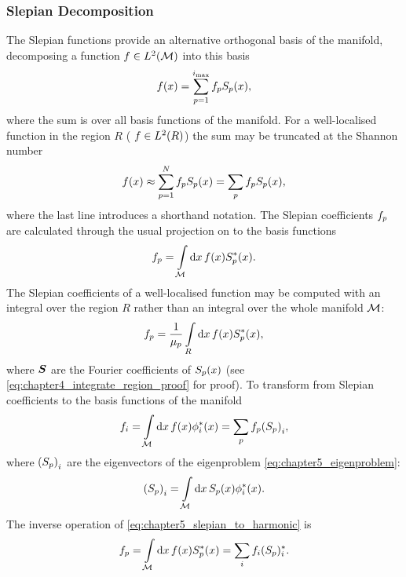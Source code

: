 \subsubsection{Slepian Decomposition}

The Slepian functions provide an alternative orthogonal basis of the manifold, decomposing a function \(f \in L^{2}(\mathcal{M})\) into this basis
%
\begin{equation}
	f(x)
	= \sum\limits_{p=1}^{i_{\text{max}}} {f}_{p} {S}_{p}(x),
\end{equation}
%
where the sum is over all basis functions of the manifold.
For a well-localised function in the region \(R\) (\ie{} \(f \in L^{2}(R)\)) the sum may be truncated at the Shannon number
%
\begin{equation}
	f(x)
	\approx \sum\limits_{p=1}^{N} {f}_{p} {S}_{p}(x)
	= \sum\limits_{p} {f}_{p} {S}_{p}(x),
\end{equation}
%
where the last line introduces a shorthand notation.
The Slepian coefficients \({f}_{p}\) are calculated through the usual projection on to the basis functions
%
\begin{equation}
	{f}_{p}
	= \int\limits_{\mathcal{M}} \dd{x} f(x) {S}_{p}^{\ast}(x).
\end{equation}
%
The Slepian coefficients of a well-localised function may be computed with an integral over the region \(R\) rather than an integral over the whole manifold \(\mathcal{M}{}\):
%
\begin{equation}
	{f}_{p}
	= \frac{1}{{\mu}_{p}} \int\limits_{R} \dd{x} f(x) {S}_{p}^{\ast}(x),
\end{equation}
%
where \(\vb*{S}\) are the Fourier coefficients of \({S}_{p}(x)\) (see \cref{eq:chapter4_integrate_region_proof} for proof).
To transform from Slepian coefficients to the basis functions of the manifold
%
\begin{equation}\label{eq:chapter5_slepian_to_harmonic}
	f_{i}
	= \int\limits_{\mathcal{M}} \dd{x} f(x) \phi_{i}^{\ast}(x)
	= \sum\limits_{p} {f}_{p} {({S}_{p})}_{i},
\end{equation}
%
where \({({S}_{p})}_{i}\) are the eigenvectors of the eigenproblem \cref{eq:chapter5_eigenproblem}:
%
\begin{equation}
	{({S}_{p})}_{i}
	= \int\limits_{\mathcal{M}} \dd{x} {S}_{p}(x) \phi_{i}^{\ast}(x).
\end{equation}
%
The inverse operation of \cref{eq:chapter5_slepian_to_harmonic} is
%
\begin{equation}
	{f}_{p}
	= \int\limits_{\mathcal{M}} \dd{x} f(x) {S}_{p}^{\ast}(x)
	= \sum\limits_{i} f_{i} ({S}_{p})^{\ast}_{i}.
\end{equation}

